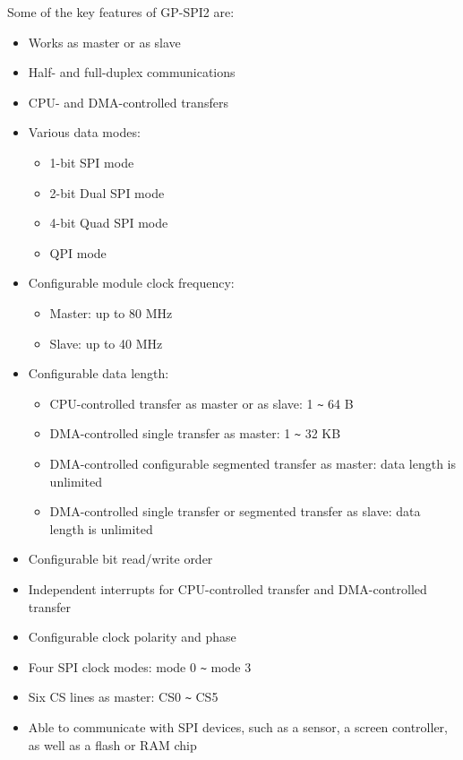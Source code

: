 \documentclass[main\_\_EN.tex]{subfiles}
\begin{document}
Some of the key features of GP-SPI2 are:
\begin{itemize}
    \item Works as master or as slave
    \item Half- and full-duplex communications
    \item CPU- and DMA-controlled transfers
    \item Various data modes:
        \begin{itemize}
            \item 1-bit SPI mode
            \item 2-bit Dual SPI mode
            \item 4-bit Quad SPI mode
            \item QPI mode
        \end{itemize}
    \item Configurable module clock frequency:
        \begin{itemize}
            \item Master: up to 80 MHz
            \item Slave: up to 40 MHz  
        \end{itemize}
    \item Configurable data length:
    \begin{itemize}
        \item CPU-controlled transfer as master or as slave: 1 \verb+~+ 64 B
        \item DMA-controlled single transfer as master: 1 \verb+~+ 32 KB 
        \item DMA-controlled configurable segmented transfer as master: data length is unlimited 
        \item DMA-controlled single transfer or segmented transfer as slave: data length is unlimited
    \end{itemize}
    \item Configurable bit read/write order
    \item Independent interrupts for CPU-controlled transfer and DMA-controlled transfer 
    \item Configurable clock polarity and phase
    \item Four SPI clock modes: mode 0 \verb+~+ mode 3
    \item Six CS lines as master: CS0 \verb+~+ CS5
    \item Able to communicate with SPI devices, such as a sensor, a screen controller, as well as a flash or RAM chip
\end{itemize}
\end{document}
